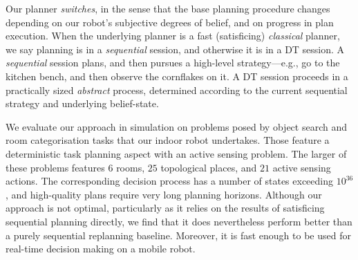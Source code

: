 Our planner {\em switches}, in the sense that the base planning
procedure changes depending on our robot's subjective degrees of
belief, and on progress in plan execution. When the underlying planner is
a fast (satisficing) {\em classical} planner, we say planning is in a
{\em sequential} session, and otherwise it is in a DT session.
A {\em sequential} session plans, and then pursues a high-level
strategy---e.g., go to the kitchen bench, and then observe the
cornflakes on it.
A DT session proceeds in a practically sized {\em abstract} process,
determined according to the current sequential strategy and underlying
belief-state.


We evaluate our approach in simulation on problems posed by object search and room categorisation tasks that our indoor
robot undertakes. Those feature a deterministic task planning aspect
with an active sensing problem. The larger of these problems features
$6$ rooms, $25$ topological places, and $21$ active sensing
actions. The corresponding decision process has a number of states
exceeding $10^{36}$, and high-quality plans require very long planning
horizons.
Although our approach is not optimal, particularly as it relies on the
results of satisficing sequential planning directly, we find that it
does nevertheless perform better than a purely sequential replanning
baseline. Moreover, it is fast enough to be used for real-time
decision making on a mobile robot.
